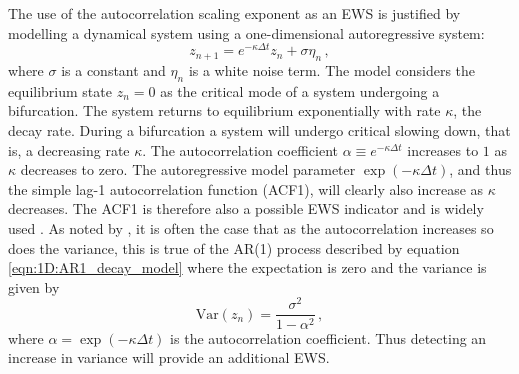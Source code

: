 {The use of the autocorrelation scaling exponent as an EWS is justified by modelling a dynamical system using a one-dimensional autoregressive system:
	\begin{equation}
	\label{eqn:1D:AR1_decay_model}
		z_{n+1} = e^{-\kappa\Delta t}z_{n} + \sigma\eta_n\,,
	\end{equation}
\citep{held2004, scheffer2009} where $\sigma$ is a constant and $\eta_n$ is a white noise term. The model considers the equilibrium state $z_n=0$ as the critical mode of a system undergoing a bifurcation. The system returns to equilibrium exponentially with rate $\kappa$, the decay rate. During a bifurcation a system will undergo critical slowing down, that is, a decreasing rate $\kappa$. The autocorrelation coefficient $\alpha \equiv e^{-\kappa\Delta t}$ increases to $1$ as $\kappa$ decreases to zero. The autoregressive model parameter $\exp(-\kappa\Delta t)$, and thus the simple lag-1 autocorrelation function (ACF1), will clearly also increase as $\kappa$ decreases. The ACF1 is therefore also a possible EWS indicator and is widely used \citep{held2004,lenton2012}. As noted by \citet{scheffer2009}, it is often the case that as the autocorrelation increases so does the variance, this is true of the AR(1) process described by equation \ref{eqn:1D:AR1_decay_model} where the expectation is zero and the variance is given by
	\begin{equation}
		\text{Var}(z_n) = \frac{\sigma^2}{1-\alpha^2}\,,
	\end{equation} 
where $\alpha=\exp(-\kappa\Delta t)$ is the autocorrelation coefficient. Thus detecting an increase in variance will provide an additional EWS.

}
